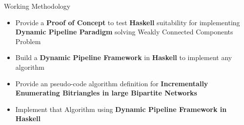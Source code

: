 \begin{frame}[fragile]{Working Methodology}
    \begin{itemize}
      \setlength\itemsep{1.5em}
      \item {\color{light}Provide a \textbf{Proof of Concept} to test \textbf{Haskell} suitability for implementing  \textbf{Dynamic Pipeline Paradigm} solving Weakly Connected Components Problem}
      \item {\color{light}Build a \textbf{Dynamic Pipeline Framework} in \textbf{Haskell} to implement any algorithm }
      \item {\color{light}Provide an pseudo-code algorithm definition for \textbf{Incrementally Enumerating Bitriangles in large Bipartite Networks}}
      \item Implement that Algorithm using \textbf{Dynamic Pipeline Framework in Haskell}
  \end{itemize}   
\end{frame}


